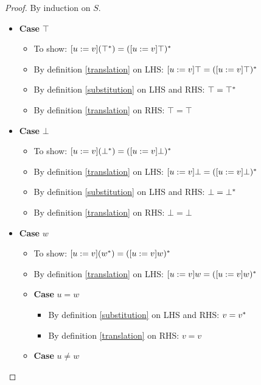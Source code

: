 \begin{proof}
    By induction on $S$.
    \begin{itemize}
        \item \textbf{Case} $\top$
        \begin{itemize}
            \item To show: $[u := v](\top^{*}) = ([u := v]\top)^{*}$
            \item By definition \ref{translation} on LHS:
                $[u := v]\top = ([u := v]\top)^{*}$
            \item By definition \ref{substitution} on LHS and RHS:
                $\top = \top^{*}$
            \item By definition \ref{translation} on RHS: $\top = \top$
        \end{itemize}
        \item \textbf{Case} $\bot$
        \begin{itemize}
            \item To show: $[u := v](\bot^{*}) = ([u := v]\bot)^{*}$
            \item By definition \ref{translation} on LHS:
                $[u := v]\bot = ([u := v]\bot)^{*}$
            \item By definition \ref{substitution} on LHS and RHS:
                $\bot = \bot^{*}$
            \item By definition \ref{translation} on RHS: $\bot = \bot$
        \end{itemize}
        \item \textbf{Case} $w$
        \begin{itemize}
            \item To show: $[u := v](w^{*}) = ([u := v]w)^{*}$
            \item By definition \ref{translation} on LHS:
                $[u := v]w = ([u := v]w)^{*}$
            \item \textbf{Case} $u = w$
            \begin{itemize}
                \item By definition \ref{substitution} on LHS and RHS:
                    $v = v^{*}$
                \item By definition \ref{translation} on RHS: $v = v$
            \end{itemize}
            \item \textbf{Case} $u \neq w$
            \begin{itemize}

\end{itemize}
\end{itemize}
\end{itemize}
\end{proof}

